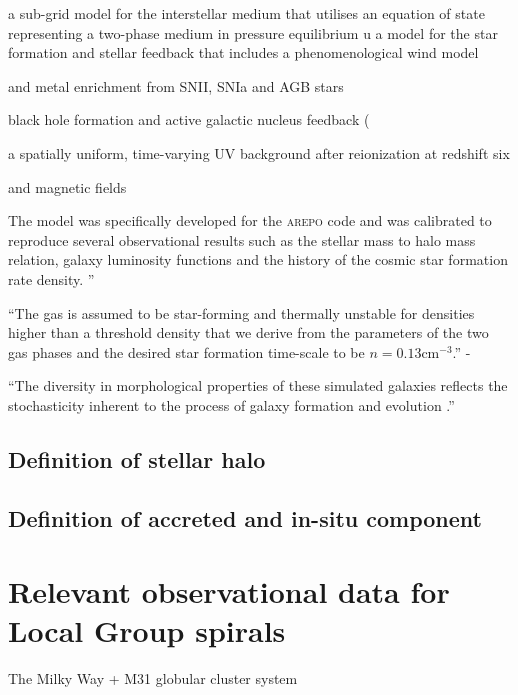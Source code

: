 \documentclass[a4paper,fleqn,usenatbib]{mnras}
\begin{document}
a sub-grid model for the interstellar medium that utilises an equation of state representing a two-phase medium in pressure equilibrium \citep{2003MNRAS.339..289S}
u
a model for the star formation and stellar feedback that includes a phenomenological wind model \citep{2014MNRAS.437.1750M, 2017MNRAS.467..179G}

and metal enrichment from SNII, SNIa and AGB stars \citep{2013MNRAS.436.3031V}

black hole formation and active galactic nucleus feedback (\citep{2005MNRAS.361..776S, 2014MNRAS.437.1750M, 2017MNRAS.467..179G}

a spatially uniform, time-varying UV background after reionization at redshift six \citep{2009ApJ...703.1416F, 2013MNRAS.436.3031V}

and magnetic fields \citep{2013MNRAS.432..176P, 2014ApJ...783L..20P}

The model was specifically developed for the \textsc{arepo} code and was calibrated to reproduce several observational results such as the stellar mass to halo mass relation, galaxy luminosity functions and the history of the cosmic star formation rate density.
''


``The gas is assumed to be star-forming and thermally unstable for densities higher than a threshold density that we derive from the parameters of the two gas phases and the desired star formation time-scale to be $n = 0.13 \text{cm}^{-3}$.'' - \citep{2017MNRAS.467..179G}


\todo[inline]
``The diversity in morphological properties of these simulated galaxies reflects the stochasticity inherent to the process of galaxy formation and evolution \citep[e.g.][]{2005ApJ...635..931B, 2010MNRAS.406..744C, 2010ApJ...708.1398T}.''

\subsection{Definition of stellar halo}


\subsection{Definition of accreted and in-situ component}



\section{Relevant observational data for Local Group spirals}
The Milky Way + M31 globular cluster system
\label{sec:observations}
\end{document}
